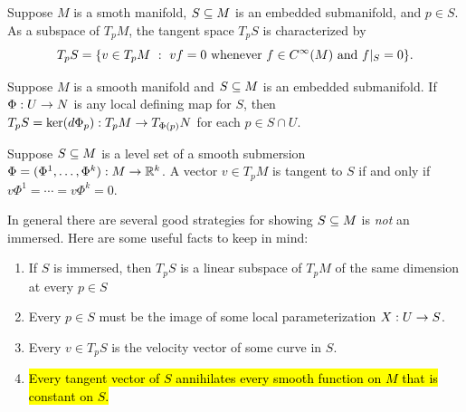 \setcounter{thm}{36}

\begin{prop}
Suppose $M$ is a smoth manifold, $S\subseteq M$ is an embedded submanifold, and $p\in S$. As a subspace of $T_pM$, the tangent space $T_pS$ is characterized by
\[T_pS = \{v\in T_pM\ :\ vf = 0\text{ whenever $f\in \Cin(M)$ and }f|_S = 0\}.\]
\end{prop}

\begin{prop}
Suppose $M$ is a smooth manifold and $S\subseteq M$ is an embedded submanifold. If $\Phi:U\rightarrow N$ is any local defining map for $S$, then $T_pS = \ker(d\Phi_p):T_pM\rightarrow T_{\Phi(p)}N$ for each $p\in S\cap U$.
\end{prop}

\begin{cor}
Suppose $S\subseteq M$ is a level set of a smooth submersion $\Phi = (\Phi^1,\ldots,\Phi^k):M\rightarrow \mathbb{R}^k$. A vector $v\in T_pM$ is tangent to $S$ if and only if $v\Phi^1= \cdots = v\Phi^k = 0$.
\end{cor}


 In general there are several good strategies for showing $S\subseteq M$ is \textit{not} an immersed. Here are some useful facts to keep in mind:
\begin{enumerate}
    \item If $S$ is immersed, then $T_pS$ is a linear subspace of $T_pM$ of the same dimension at every $p\in S$
    \item Every $p\in S$ must be the image of some local parameterization $X:U\rightarrow S$.
    \item Every $v\in T_pS$ is the velocity vector of some curve in $S$.
    \item \hl{Every tangent vector of $S$ annihilates every smooth function on $M$ that is constant on $S$.}
\end{enumerate}